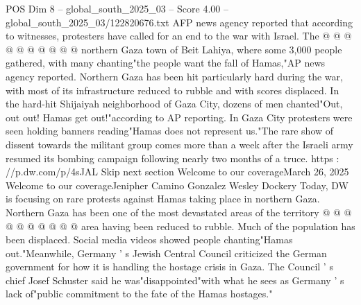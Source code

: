 \begin{textsample}{POS Dim 8 – global\_south\_2025\_03 – Score 4.00 – global\_south\_2025\_03/122820676.txt}
AFP news agency reported that according to witnesses, protesters have called for an end to the war with Israel.
The @ @ @ @ @ @ @ @ @ @ northern Gaza town of Beit Lahiya, where some 3,000 people gathered, with many chanting"the people want the fall of Hamas,"AP news agency reported.
Northern Gaza has been hit particularly hard during the war, with most of its infrastructure reduced to rubble and with scores displaced.
In the hard-hit Shijaiyah neighborhood of Gaza City, dozens of men chanted"Out, out out!
Hamas get out!"according to AP reporting.
In Gaza City protesters were seen holding banners reading"Hamas does not represent us."The rare show of dissent towards the militant group comes more than a week after the Israeli army resumed its bombing campaign following nearly two months of a truce. https : //p.dw.com/p/4sJAL Skip next section Welcome to our coverageMarch 26, 2025 Welcome to our coverageJenipher Camino Gonzalez Wesley Dockery Today, DW is focusing on rare protests against Hamas taking place in northern Gaza.
Northern Gaza has been one of the most devastated areas of the territory @ @ @ @ @ @ @ @ @ @ area having been reduced to rubble.
Much of the population has been displaced.
Social media videos showed people chanting"Hamas out."Meanwhile, Germany ' s Jewish Central Council criticized the German government for how it is handling the hostage crisis in Gaza.
The Council ' s chief Josef Schuster said he was"disappointed"with what he sees as Germany ' s lack of"public commitment to the fate of the Hamas hostages."

\end{textsample}
